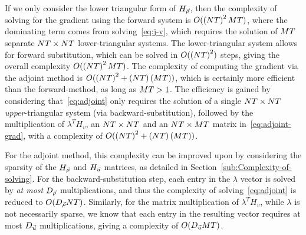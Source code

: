 				If we only consider the lower triangular form of $H_{\vec{\rho}}$, then the
				complexity of solving for the gradient using the forward system is
				$O(\left(NT\right)^{2}MT)$, where the dominating
				term comes from solving~\eqref{eq:j-v}, which requires the solution
				of $MT$ separate $NT\times NT$
				lower-triangular systems. The lower-triangular system allows for forward
				substitution, which can be solved in $O(\left(NT\right)^{2})$
				steps, giving the overall complexity $O(\left(NT\right)^{2}MT)$.
				The complexity of computing the gradient via the adjoint method is
				$O(\left(NT\right)^{2}+\left(NT\right)\left(MT\right))$,
				which is certainly more efficient than the forward-method, as long
				as $MT>1$. The efficiency is gained by considering
				that~\eqref{eq:adjoint} only requires the solution of a single $NT\times NT$
				\emph{upper}-triangular system (via backward-substitution), followed
				by the multiplication of $\lambda^{T}H_{v}$, an $NT\times NT$
				and an $NT\times MT$ matrix in~\eqref{eq:adjoint-grad},
				with a complexity of $O(\left(NT\right)^{2}+\left(NT\right)\left(MT\right))$.
								
				For the adjoint method, this complexity can be improved upon by considering
				the sparsity of the $H_{\vec{\rho}}$ and $H_{\vec{u}}$ matrices, as detailed in Section~\ref{sub:Complexity-of-solving}.
				For the backward-substitution step, each entry in the $\lambda$ vector
				is solved by \emph{at most} $D_{\vec{\rho}}$ multiplications, and
				thus the complexity of solving~\eqref{eq:adjoint} is reduced to
				$O(D_{\vec{\rho}}NT)$. Similarly, for the matrix multiplication
				of $\lambda^{T}H_{v}$, while $\lambda$ is not necessarily sparse,
				we know that each entry in the resulting vector requires at most $D_{\vec{u}}$
				multiplications, giving a complexity of $O(D_{\vec{u}}MT)$. 				
